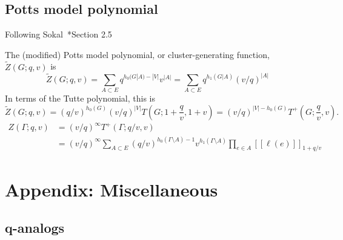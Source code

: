 \documentclass{amsart}
\theoremstyle{definition}
\newcommand{\fanalog}[2]{[\![#2]\!]_{#1}}
\begin{document}
\subsection{Potts model polynomial}

Following Sokal~\cite{Sok-potts}*{Section 2.5}

The (modified) Potts model polynomial, or cluster-generating function, $\widetilde Z(G; q,v)$ is
\[
	\widetilde Z(G; q, v) = \sum_{A \subset E} q^{h_0(G|A) - |V|} v^{|A|}
	= \sum_{A \subset E} q^{h_1(G|A)} (v/q)^{|A|}
\]
In terms of the Tutte polynomial, this is
\[
	\widetilde Z(G; q,v) = (q/v)^{h_0(G)} (v/q)^{|V|} T(G; 1 + \frac{q}{v}, 1 + v) 
	= (v/q)^{|V| - h_0(G)} T^+(G; \frac{q}{v}, v) .
\]
\begin{align*}
	Z(\Gamma; q, v) &= (v/q)^{\infty} T^+(\Gamma; q/v, v) \\
	&= (v/q)^{\infty} \sum_{A \subset E} (q/v)^{h_0(\Gamma \setminus A) - 1} v^{h_1(\Gamma \setminus A)} \prod_{e \in A} \fanalog{1 + q/v}{\ell(e)}
\end{align*}

\section*{Appendix: Miscellaneous}

\subsection{q-analogs}
\end{document}
